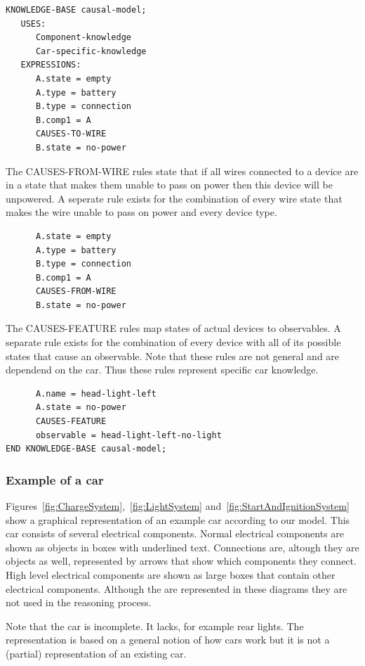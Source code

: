 \documentclass[a4paper,10pt]{article}
\begin{document}
\begin{verbatim}
KNOWLEDGE-BASE causal-model;
   USES:
      Component-knowledge
      Car-specific-knowledge
   EXPRESSIONS:
      A.state = empty
      A.type = battery
      B.type = connection
      B.comp1 = A
      CAUSES-TO-WIRE
      B.state = no-power
\end{verbatim}

\noindent
The CAUSES-FROM-WIRE rules state that if all wires connected to a device are in a state that makes them unable to pass on power then this device will be unpowered. A seperate rule exists for the combination of every wire state that makes the wire unable to pass on power and every device type.

\begin{verbatim}
      A.state = empty
      A.type = battery
      B.type = connection
      B.comp1 = A
      CAUSES-FROM-WIRE
      B.state = no-power
\end{verbatim}

\noindent
The CAUSES-FEATURE rules map states of actual devices to observables. A separate rule exists for the combination of every device with all of its possible states that cause an observable. Note that these rules are not general and are dependend on the car. Thus these rules represent specific car knowledge.

\begin{verbatim}
      A.name = head-light-left
      A.state = no-power
      CAUSES-FEATURE
      observable = head-light-left-no-light
END KNOWLEDGE-BASE causal-model;
\end{verbatim}


\subsubsection{Example of a car}
Figures~\ref{fig:ChargeSystem},~\ref{fig:LightSystem} and~\ref{fig:StartAndIgnitionSystem} show a graphical representation of an example car according to our model. This car consists of several electrical components. Normal electrical components are shown as objects in boxes with underlined text. Connections are, altough they are objects as well, represented by arrows that show which components they connect. High level electrical components are shown as large boxes that contain other electrical components. Although the are represented in these diagrams they are not used in the reasoning process.

Note that the car is incomplete. It lacks, for example rear lights. The representation is based on a general notion of how cars work but it is not a (partial) representation of an existing car.
\end{document}
